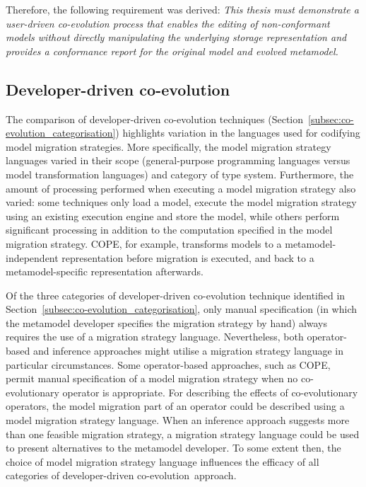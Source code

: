 Therefore, the following requirement was derived: \emph{This thesis must demonstrate a user-driven co-evolution process that enables the editing of non-co\-nf\-or\-ma\-nt models without directly manipulating the underlying storage representation and provides a conformance report for the original model and evolved metamodel.}


\subsection{Developer-driven co-evolution}
The comparison of developer-driven co-evolution techniques (Section~\ref{subsec:co-evolution_categorisation}) highlights variation in the languages used for codifying model migration strategies. More specifically, the model migration strategy languages varied in their scope (general-purpose programming languages versus model transformation languages) and category of type system. Furthermore, the amount of processing performed when executing a model migration strategy also varied: some techniques only load a model, execute the model migration strategy using an existing execution engine and store the model, while others perform significant processing in addition to the computation specified in the model migration strategy. COPE, for example, transforms models to a metamodel-independent representation before migration is executed, and back to a metamodel-specific representation afterwards.

Of the three categories of developer-driven co-evolution technique identified in Section~\ref{subsec:co-evolution_categorisation}, only manual specification (in which the metamodel developer specifies the migration strategy by hand) always requires the use of a migration strategy language. Nevertheless, both operator-based and inference approaches might utilise a migration strategy language in particular circumstances. Some operator-based approaches, such as COPE, permit manual specification of a model migration strategy when no co-evolutionary operator is appropriate. For describing the effects of co-evolutionary operators, the model migration part of an operator could be described using a model migration strategy language. When an inference approach suggests more than one feasible migration strategy, a migration strategy language could be used to present alternatives to the metamodel developer. To some extent then, the choice of model migration strategy language influences the efficacy of all categories of developer-driven co-evolution approach.  

